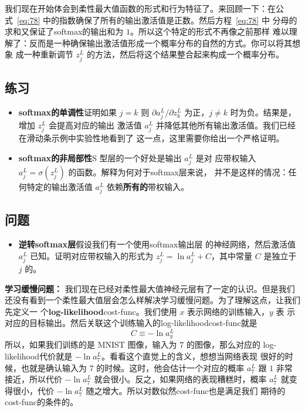 我们现在开始体会到柔性最大值函数的形式和行为特征了。来回顾一下：在公
式~\eqref{eq:78} 中的指数确保了所有的输出激活值是正数。然后方程~\eqref{eq:78} 中
分母的求和又保证了\gls*{softmax}的输出和为 $1$。所以这个特定的形式不再像之前那样
难以理解了：反而是一种确保输出激活值形成一个概率分布的自然的方式。你可以将其想象
成一种重新调节 $z^L_j$ 的方法，然后将这个结果整合起来构成一个概率分布。

\subsection*{练习}

\begin{itemize}
\item \textbf{\gls*{softmax}的单调性}\quad 证明如果 $j=k$ 则 $\partial a^L_j /
  \partial z^L_k$ 为正，$j \neq k$ 时为负。结果是，增加 $z^L_j$ 会提高对应的输出
  激活值 $a^L_j$ 并降低其他所有输出激活值。我们已经在滑动条示例中实验性地看到了
  这一点，这里需要你给出一个严格证明。
\item \textbf{\gls*{softmax}的非局部性}\quad S 型层的一个好处是输出 $a^L_j$ 是对
  应带权输入 $a^L_j = \sigma(z^L_j)$ 的函数。解释为何对于\gls*{softmax}层来说，
  并不是这样的情况：任何特定的输出激活值 $a^L_j$ 依赖\textbf{所有的}带权输入。
\end{itemize}

\subsection*{问题}

\begin{itemize}
\item \textbf{逆转\gls*{softmax}层}\quad 假设我们有一个使用\gls*{softmax}输出层
  的神经网络，然后激活值 $a^L_j$ 已知。证明对应带权输入的形式为 $z^L_j = \ln
  a^L_j + C$，其中常量 $C$ 是独立于 $j$ 的。
\end{itemize}

\textbf{学习缓慢问题：} 我们现在已经对柔性最大值神经元层有了一定的认识。但是我们
还没有看到一个柔性最大值层会怎么样解决学习缓慢问题。为了理解这点，让我们先定义一
个\textbf{\gls{log-likelihood}}\gls*{cost-func}。我们使用 $x$ 表示网络的训练输入，$y$ 表
示对应的目标输出。然后关联这个训练输入的\gls*{log-likelihood}\gls*{cost-func}就是
\begin{equation}
  C \equiv -\ln a^L_y
  \label{eq:80}\tag{80}
\end{equation}
所以，如果我们训练的是 MNIST 图像，输入为 $7$ 的图像，那么对应的%
\gls*{log-likelihood}代价就是 $-\ln a_7^L$。看看这个直觉上的含义，想想当网络表现
很好的时候，也就是确认输入为 $7$ 的时候。这时，他会估计一个对应的概率 $a_7^L$ 跟
$1$ 非常接近，所以代价 $-\ln a_7^L$ 就会很小。反之，如果网络的表现糟糕时，概率
$a_7^L$ 就变得很小，代价 $-\ln a_7^L$ 随之增大。所以对数似然\gls*{cost-func}也是满足我们
期待的\gls*{cost-func}的条件的。

